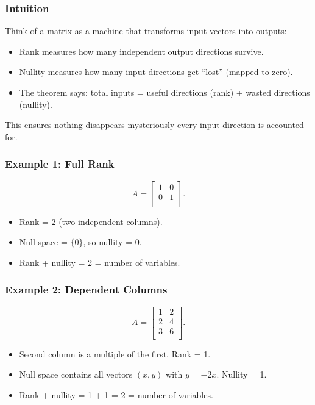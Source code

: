 \documentclass[
  letterpaper,
  DIV=11,
  numbers=noendperiod]{scrreprt}
\providecommand{\tightlist}{%
  \setlength{\itemsep}{0pt}\setlength{\parskip}{0pt}}
\begin{document}
\subsubsection{Intuition}\label{intuition-2}

Think of a matrix as a machine that transforms input vectors into
outputs:

\begin{itemize}
\tightlist
\item
  Rank measures how many independent output directions survive.
\item
  Nullity measures how many input directions get ``lost'' (mapped to
  zero).
\item
  The theorem says: total inputs = useful directions (rank) + wasted
  directions (nullity).
\end{itemize}

This ensures nothing disappears mysteriously-every input direction is
accounted for.

\subsubsection{Example 1: Full Rank}\label{example-1-full-rank}

\[
A = \begin{bmatrix}  
1 & 0 \\  
0 & 1 \\  
\end{bmatrix}.
\]

\begin{itemize}
\tightlist
\item
  Rank = 2 (two independent columns).
\item
  Null space = \(\{0\}\), so nullity = 0.
\item
  Rank + nullity = 2 = number of variables.
\end{itemize}

\subsubsection{Example 2: Dependent
Columns}\label{example-2-dependent-columns}

\[
A = \begin{bmatrix}  
1 & 2 \\  
2 & 4 \\  
3 & 6 \\  
\end{bmatrix}.
\]

\begin{itemize}
\tightlist
\item
  Second column is a multiple of the first. Rank = 1.
\item
  Null space contains all vectors \((x,y)\) with \(y = -2x\). Nullity =
  1.
\item
  Rank + nullity = 1 + 1 = 2 = number of variables.
\end{itemize}
\end{document}
